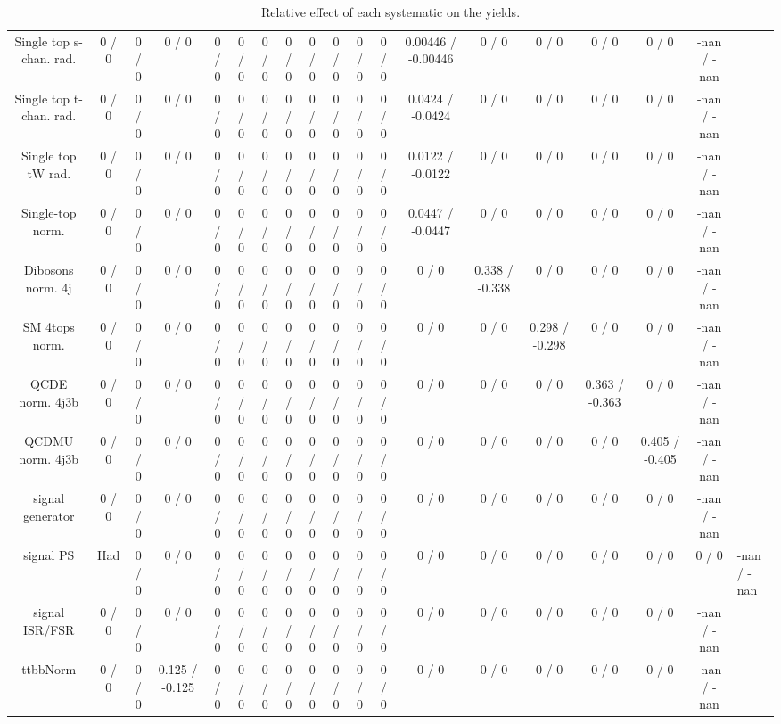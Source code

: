 \documentclass[10pt]{article}
\begin{document}
\begin{table}[htbp]
\begin{center}
\begin{tabular}{|c|c|c|c|c|c|c|c|c|c|c|c|c|c|c|c|c|c|}
  Single top s-chan. rad. & 0 / 0 & 0 / 0 & 0 / 0 & 0 / 0 & 0 / 0 & 0 / 0 & 0 / 0 & 0 / 0 & 0 / 0 & 0 / 0 & 0 / 0 & 0.00446 / -0.00446 & 0 / 0 & 0 / 0 & 0 / 0 & 0 / 0 & -nan / -nan \\ 
  Single top t-chan. rad. & 0 / 0 & 0 / 0 & 0 / 0 & 0 / 0 & 0 / 0 & 0 / 0 & 0 / 0 & 0 / 0 & 0 / 0 & 0 / 0 & 0 / 0 & 0.0424 / -0.0424 & 0 / 0 & 0 / 0 & 0 / 0 & 0 / 0 & -nan / -nan \\ 
  Single top tW rad. & 0 / 0 & 0 / 0 & 0 / 0 & 0 / 0 & 0 / 0 & 0 / 0 & 0 / 0 & 0 / 0 & 0 / 0 & 0 / 0 & 0 / 0 & 0.0122 / -0.0122 & 0 / 0 & 0 / 0 & 0 / 0 & 0 / 0 & -nan / -nan \\ 
  Single-top norm. & 0 / 0 & 0 / 0 & 0 / 0 & 0 / 0 & 0 / 0 & 0 / 0 & 0 / 0 & 0 / 0 & 0 / 0 & 0 / 0 & 0 / 0 & 0.0447 / -0.0447 & 0 / 0 & 0 / 0 & 0 / 0 & 0 / 0 & -nan / -nan \\ 
  Dibosons norm. 4j & 0 / 0 & 0 / 0 & 0 / 0 & 0 / 0 & 0 / 0 & 0 / 0 & 0 / 0 & 0 / 0 & 0 / 0 & 0 / 0 & 0 / 0 & 0 / 0 & 0.338 / -0.338 & 0 / 0 & 0 / 0 & 0 / 0 & -nan / -nan \\ 
  SM 4tops norm. & 0 / 0 & 0 / 0 & 0 / 0 & 0 / 0 & 0 / 0 & 0 / 0 & 0 / 0 & 0 / 0 & 0 / 0 & 0 / 0 & 0 / 0 & 0 / 0 & 0 / 0 & 0.298 / -0.298 & 0 / 0 & 0 / 0 & -nan / -nan \\ 
  QCDE norm. 4j3b & 0 / 0 & 0 / 0 & 0 / 0 & 0 / 0 & 0 / 0 & 0 / 0 & 0 / 0 & 0 / 0 & 0 / 0 & 0 / 0 & 0 / 0 & 0 / 0 & 0 / 0 & 0 / 0 & 0.363 / -0.363 & 0 / 0 & -nan / -nan \\ 
  QCDMU norm. 4j3b & 0 / 0 & 0 / 0 & 0 / 0 & 0 / 0 & 0 / 0 & 0 / 0 & 0 / 0 & 0 / 0 & 0 / 0 & 0 / 0 & 0 / 0 & 0 / 0 & 0 / 0 & 0 / 0 & 0 / 0 & 0.405 / -0.405 & -nan / -nan \\ 
  signal generator & 0 / 0 & 0 / 0 & 0 / 0 & 0 / 0 & 0 / 0 & 0 / 0 & 0 / 0 & 0 / 0 & 0 / 0 & 0 / 0 & 0 / 0 & 0 / 0 & 0 / 0 & 0 / 0 & 0 / 0 & 0 / 0 & -nan / -nan \\ 
  signal PS & Had & 0 / 0 & 0 / 0 & 0 / 0 & 0 / 0 & 0 / 0 & 0 / 0 & 0 / 0 & 0 / 0 & 0 / 0 & 0 / 0 & 0 / 0 & 0 / 0 & 0 / 0 & 0 / 0 & 0 / 0 & 0 / 0 & -nan / -nan \\ 
  signal ISR/FSR & 0 / 0 & 0 / 0 & 0 / 0 & 0 / 0 & 0 / 0 & 0 / 0 & 0 / 0 & 0 / 0 & 0 / 0 & 0 / 0 & 0 / 0 & 0 / 0 & 0 / 0 & 0 / 0 & 0 / 0 & 0 / 0 & -nan / -nan \\ 
 ttbbNorm & 0 / 0 & 0 / 0 & 0.125 / -0.125 & 0 / 0 & 0 / 0 & 0 / 0 & 0 / 0 & 0 / 0 & 0 / 0 & 0 / 0 & 0 / 0 & 0 / 0 & 0 / 0 & 0 / 0 & 0 / 0 & 0 / 0 & -nan / -nan \\ 
\hline 
\end{tabular} 
\caption{Relative effect of each systematic on the yields.} 
\end{center} 
\end{table} 
\end{document}
